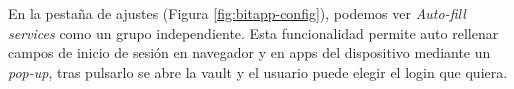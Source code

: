 En la pestaña de ajustes (Figura \ref{fig:bitapp-config}), podemos ver \textit{Auto-fill services} como un grupo independiente.
Esta funcionalidad permite auto rellenar campos de inicio de sesión en navegador y en apps del dispositivo mediante un \textit{pop-up}, tras pulsarlo se abre la \gls{vault} y el usuario puede elegir el \gls{login} que quiera.
\newpage
\begin{multicols}{2}[]
    \begin{figure}[H]
        \centering

\end{figure}
\end{multicols}
